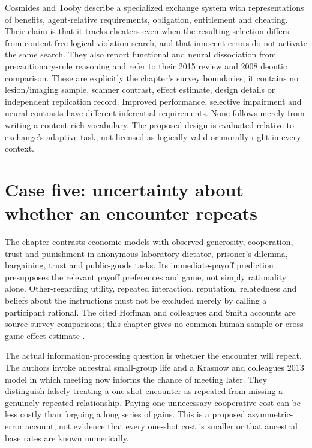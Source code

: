 Cosmides and Tooby describe a specialized exchange system with
representations of benefits, agent-relative requirements, obligation,
entitlement and cheating. Their claim is that it tracks cheaters even
when the resulting selection differs from content-free logical
violation search, and that innocent errors do not activate the same
search. They also report functional and neural dissociation from
precautionary-rule reasoning and refer to their 2015 review and 2008
deontic comparison. These are explicitly the chapter's survey boundaries;
it contains no lesion/imaging sample, scanner contrast, effect estimate,
design details or independent replication record. Improved performance,
selective impairment and neural contrasts have different inferential
requirements. None follows merely from writing a content-rich vocabulary.
The proposed design is evaluated relative to exchange's adaptive task,
not licensed as logically valid or morally right in every context.

\section{Case five: uncertainty about whether an encounter repeats}
\label{sec:p11-rat106-reciprocity}

The chapter contrasts economic models with observed generosity,
cooperation, trust and punishment in anonymous laboratory dictator,
prisoner's-dilemma, bargaining, trust and public-goods tasks. Its
immediate-payoff prediction presupposes the relevant payoff preferences
and game, not simply rationality alone. Other-regarding utility, repeated
interaction, reputation, relatedness and beliefs about the instructions
must not be excluded merely by calling a participant rational.
The cited Hoffman and colleagues and Smith accounts are source-survey
comparisons; this chapter gives no common human sample or cross-game
effect estimate \cite[p.~640]{CosmidesTooby2021Adaptationism}.

The actual information-processing question is whether the encounter
will repeat. The authors invoke ancestral small-group life and a
Krasnow and colleagues 2013 model in which meeting now informs the
chance of meeting later. They distinguish falsely treating a one-shot
encounter as repeated from missing a genuinely repeated relationship.
Paying one unnecessary cooperative cost can be less costly than
forgoing a long series of gains. This is a proposed asymmetric-error
account, not evidence that every one-shot cost is smaller or that
ancestral base rates are known numerically.


